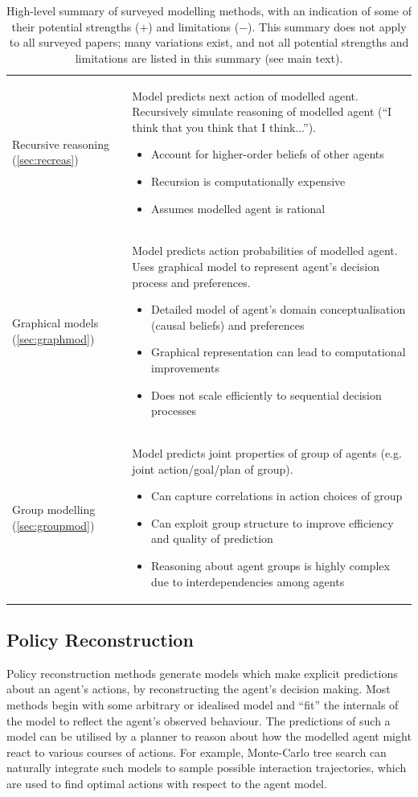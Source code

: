 \documentclass[final,1p,times,authoryear]{elsarticle}
\makeatletter
\newcommand{\nil}{@{}}
\newcommand{\proconlist}{\vspace{-3pt}\begin{itemize}[leftmargin=10pt,itemsep=-1pt]}
\newcommand{\itempro}{\renewcommand{\labelitemi}{$+$}\item}
\newcommand{\itemcon}{\renewcommand{\labelitemi}{$-$}\item}
\newcommand{\elist}{\end{itemize}}
\makeatother
\begin{document}
\begin{table}[h]
\begin{tabular}{\nil p{} \nil p{} \nil}
		Recursive reasoning (\ref{sec:recreas}) &
		Model predicts next action of modelled agent. Recursively simulate reasoning of modelled agent (``I think that you think that I think...'').
		\proconlist
			\itempro Account for higher-order beliefs of other agents
			\itemcon Recursion is computationally expensive
			\itemcon Assumes modelled agent is rational
		\elist \\

		Graphical models (\ref{sec:graphmod}) &
		Model predicts action probabilities of modelled agent. Uses graphical model to represent agent's decision process and preferences.
		\proconlist
			\itempro Detailed model of agent's domain conceptualisation (causal beliefs) and preferences
			\itempro Graphical representation can lead to computational improvements
			\itemcon Does not scale efficiently to sequential decision processes
		\elist \\

		Group modelling (\ref{sec:groupmod}) &
		Model predicts joint properties of group of agents (e.g. joint action/goal/plan of group).
		\proconlist
			\itempro Can capture correlations in action choices of group
			\itempro Can exploit group structure to improve efficiency and quality of prediction
			\itemcon Reasoning about agent groups is highly complex due to interdependencies among agents
		\elist \\

		\bottomrule
	\end{tabular}
	\egroup
	\caption{High-level summary of surveyed modelling methods, with an indication of some of their potential strengths ($+$) and limitations ($-$). This summary does not apply to all surveyed papers; many variations exist, and not all potential strengths and limitations are listed in this summary (see main text).}
	\label{tab:methodsummary}
\end{table}

\FloatBarrier


		\subsection{\bf Policy Reconstruction} \label{sec:policyrec}

Policy reconstruction methods generate models which make explicit predictions about an agent's actions, by reconstructing the agent's decision making. Most methods begin with some arbitrary or idealised model and ``fit'' the internals of the model to reflect the agent's observed behaviour. The predictions of such a model can be utilised by a planner to reason about how the modelled agent might react to various courses of actions. For example, Monte-Carlo tree search \citep{bpwl2012} can naturally integrate such models to sample possible interaction trajectories, which are used to find optimal actions with respect to the agent model.
\end{document}
